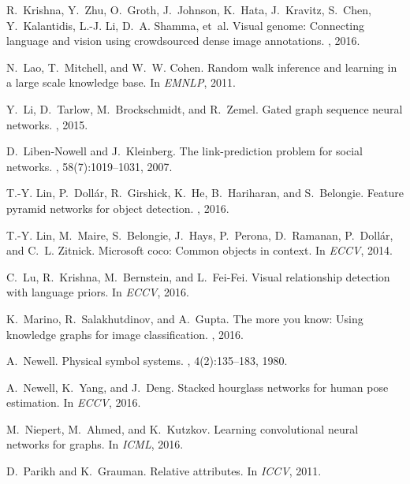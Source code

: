 \documentclass[10pt,twocolumn,letterpaper]{article}
\begin{document}
{\begin{thebibliography}{10}
R.~Krishna, Y.~Zhu, O.~Groth, J.~Johnson, K.~Hata, J.~Kravitz, S.~Chen,
  Y.~Kalantidis, L.-J. Li, D.~A. Shamma, et~al.
\newblock Visual genome: Connecting language and vision using crowdsourced
  dense image annotations.
, 2016.

N.~Lao, T.~Mitchell, and W.~W. Cohen.
\newblock Random walk inference and learning in a large scale knowledge base.
\newblock In {\em EMNLP}, 2011.

Y.~Li, D.~Tarlow, M.~Brockschmidt, and R.~Zemel.
\newblock Gated graph sequence neural networks.
, 2015.

D.~Liben-Nowell and J.~Kleinberg.
\newblock The link-prediction problem for social networks.
, 58(7):1019--1031, 2007.

T.-Y. Lin, P.~Doll{\'a}r, R.~Girshick, K.~He, B.~Hariharan, and S.~Belongie.
\newblock Feature pyramid networks for object detection.
, 2016.

T.-Y. Lin, M.~Maire, S.~Belongie, J.~Hays, P.~Perona, D.~Ramanan,
  P.~Doll{\'a}r, and C.~L. Zitnick.
\newblock Microsoft coco: Common objects in context.
\newblock In {\em ECCV}, 2014.

C.~Lu, R.~Krishna, M.~Bernstein, and L.~Fei-Fei.
\newblock Visual relationship detection with language priors.
\newblock In {\em ECCV}, 2016.

K.~Marino, R.~Salakhutdinov, and A.~Gupta.
\newblock The more you know: Using knowledge graphs for image classification.
, 2016.

A.~Newell.
\newblock Physical symbol systems.
, 4(2):135--183, 1980.

A.~Newell, K.~Yang, and J.~Deng.
\newblock Stacked hourglass networks for human pose estimation.
\newblock In {\em ECCV}, 2016.

M.~Niepert, M.~Ahmed, and K.~Kutzkov.
\newblock Learning convolutional neural networks for graphs.
\newblock In {\em ICML}, 2016.

D.~Parikh and K.~Grauman.
\newblock Relative attributes.
\newblock In {\em ICCV}, 2011.


\end{thebibliography}}
\end{document}
